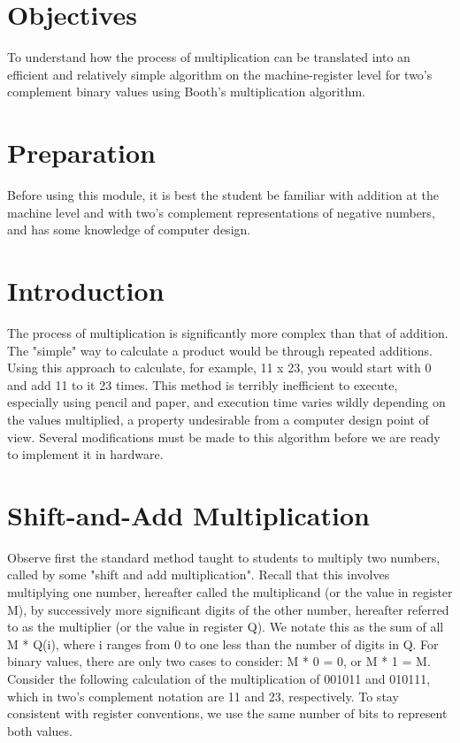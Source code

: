 \documentclass{article}
\begin{document}
\section{Objectives}
To understand how the process of multiplication can be translated into an efficient and relatively simple algorithm on the machine-register level for two's complement binary values using Booth's multiplication algorithm.

\section{Preparation}
Before using this module, it is best the student be familiar with addition at the machine level and with two's complement representations of negative numbers, and has some knowledge of computer design.

\section{Introduction}
The process of multiplication is significantly more complex than that of addition.
The "simple" way to calculate a product would be through repeated additions.
Using this approach to calculate, for example, 11 x 23, you would start with 0 and add 11 to it 23 times.
This method is terribly inefficient to execute, especially using pencil and paper, and execution time varies wildly depending on the values multiplied, a property undesirable from a computer design point of view.
Several modifications must be made to this algorithm before we are ready to implement it in hardware.

\section{Shift-and-Add Multiplication}
Observe first the standard method taught to students to multiply two numbers, called by some "shift and add multiplication".
Recall that this involves multiplying one number, hereafter called the multiplicand (or the value in register M), by successively more significant digits of the other number, hereafter referred to as the multiplier (or the value in register Q).
We notate this as the sum of all M * Q(i), where i ranges from 0 to one less than the number of digits in Q.
For binary values, there are only two cases to consider: M * 0 = 0, or M * 1 = M.
Consider the following calculation of the multiplication of 001011 and 010111, which in two's complement notation are 11 and 23, respectively.
To stay consistent with register conventions, we use the same number of bits to represent both values.
\end{document}
